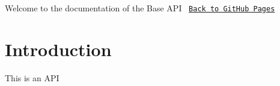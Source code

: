 Welcome to the documentation of the Base A\+PI~\newline
\href{https://pettitpeon.github.io/rpiapi/}{\tt Back to Git\+Hub Pages}\hypertarget{index_intro_sec}{}\section{Introduction}\label{index_intro_sec}
This is an A\+PI 